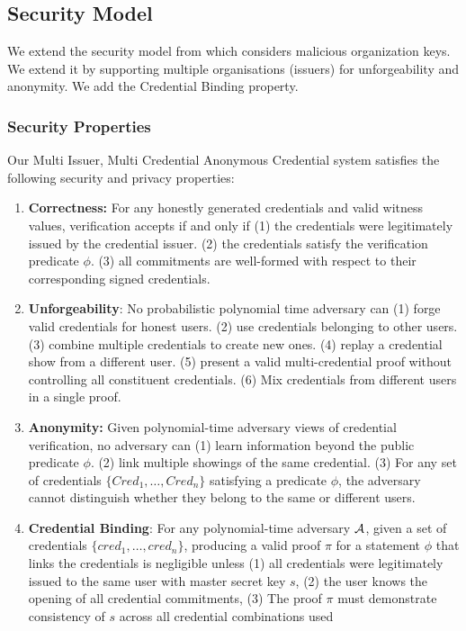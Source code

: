 \subsection{Security Model}

We extend the security model from \cite{fuchsbauer_structure-preserving_2019} which considers malicious organization keys.
We extend it by supporting multiple organisations (issuers) for unforgeability and anonymity.
We add the Credential Binding property. 
 
\subsubsection{Security Properties}
Our Multi Issuer, Multi Credential Anonymous Credential system satisfies the following security and privacy properties:
\begin{enumerate}
    \item \textbf{Correctness: } For any honestly generated credentials and valid witness values, verification accepts if and only if (1) the credentials were legitimately issued by the credential issuer. (2) the credentials satisfy the verification predicate $\phi$. (3) all commitments are well-formed with respect to their corresponding signed credentials. 
    
    \item \textbf{Unforgeability}: No probabilistic polynomial time adversary can (1) forge valid credentials for honest users. (2) use credentials belonging to other users. (3) combine multiple credentials to create new ones. (4) replay a credential show from a different user. (5) present a valid multi-credential proof without controlling all constituent credentials. (6) Mix credentials from different users in a single proof.
    
    \item \textbf{Anonymity:} Given polynomial-time adversary views of credential verification, no adversary can (1) learn information beyond the public predicate $\phi$. (2) link multiple showings of the same credential. (3) For any set of credentials $\{Cred_1,\dots,Cred_n\}$ satisfying a predicate $\phi$, the adversary cannot distinguish whether they belong to the same or different users.

    \item \textbf{Credential Binding}: For any polynomial-time adversary $\mathcal{A}$, given a set of credentials $\{cred_1, \dots, cred_n \}$, producing a valid proof $\pi$ for a statement $\phi$ that links the credentials is negligible unless (1) all credentials were legitimately issued to the same user with master secret key $s$, (2) the user knows the opening of all credential commitments, (3) The proof $\pi$ must demonstrate consistency of $s$ across all credential combinations used

\end{enumerate}

